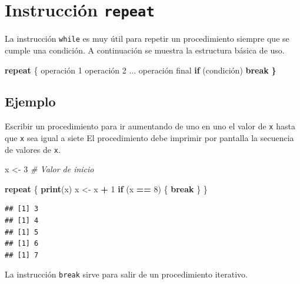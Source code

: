 \documentclass[10pt,]{krantz}
\makeatletter
\newenvironment{Shaded}{\begin{snugshade}}{\end{snugshade}}
\newcommand{\KeywordTok}[1]{\textcolor[rgb]{0.13,0.29,0.53}{\textbf{#1}}}
\newcommand{\DecValTok}[1]{\textcolor[rgb]{0.00,0.00,0.81}{#1}}
\newcommand{\StringTok}[1]{\textcolor[rgb]{0.31,0.60,0.02}{#1}}
\newcommand{\CommentTok}[1]{\textcolor[rgb]{0.56,0.35,0.01}{\textit{#1}}}
\newcommand{\ControlFlowTok}[1]{\textcolor[rgb]{0.13,0.29,0.53}{\textbf{#1}}}
\newcommand{\OperatorTok}[1]{\textcolor[rgb]{0.81,0.36,0.00}{\textbf{#1}}}
\newcommand{\ErrorTok}[1]{\textcolor[rgb]{0.64,0.00,0.00}{\textbf{#1}}}
\newcommand{\NormalTok}[1]{#1}
\newenvironment{kframe}{%
\medskip{}
\setlength{\fboxsep}{.8em}
 \def\at@end@of@kframe{}%
 \ifinner\ifhmode%
  \def\at@end@of@kframe{\end{minipage}}%
  \begin{minipage}{\columnwidth}%
 \fi\fi%
 \def\FrameCommand##1{\hskip\@totalleftmargin \hskip-\fboxsep
 \colorbox{shadecolor}{##1}\hskip-\fboxsep
     \hskip-\linewidth \hskip-\@totalleftmargin \hskip\columnwidth}%
 \MakeFramed {\advance\hsize-\width
   \@totalleftmargin\z@ \linewidth\hsize
   \@setminipage}}%
 {\par\unskip\endMakeFramed%
 \at@end@of@kframe}
\renewenvironment{Shaded}{\begin{kframe}}{\end{kframe}}
\let\BeginKnitrBlock\begin \let\EndKnitrBlock\end
\makeatother
\begin{document}
\section{\texorpdfstring{Instrucción \texttt{repeat}
}{Instrucción repeat }}\label{instruccion-repeat}

La instrucción \texttt{while} es muy útil para repetir un procedimiento
siempre que se cumple una condición. A continuación se muestra la
estructura básica de uso.

\begin{Shaded}
\begin{Highlighting}[]
\ControlFlowTok{repeat}\NormalTok{ \{}
\NormalTok{  operación }\DecValTok{1}
\NormalTok{  operación }\DecValTok{2}
\NormalTok{  ...}
\NormalTok{  operación final}
  \ControlFlowTok{if}\NormalTok{ (condición) }\ControlFlowTok{break}
\ErrorTok{\}}
\end{Highlighting}
\end{Shaded}

\subsection*{Ejemplo}\label{ejemplo-19}


Escribir un procedimiento para ir aumentando de uno en uno el valor de
\texttt{x} hasta que \texttt{x} sea igual a siete El procedimiento debe
imprimir por pantalla la secuencia de valores de \texttt{x}.

\begin{Shaded}
\begin{Highlighting}[]
\NormalTok{x <-}\StringTok{ }\DecValTok{3}  \CommentTok{# Valor de inicio}

\ControlFlowTok{repeat}\NormalTok{ \{}
   \KeywordTok{print}\NormalTok{(x)}
\NormalTok{   x <-}\StringTok{  }\NormalTok{x }\OperatorTok{+}\StringTok{ }\DecValTok{1}
   \ControlFlowTok{if}\NormalTok{ (x }\OperatorTok{==}\StringTok{ }\DecValTok{8}\NormalTok{) \{}
     \ControlFlowTok{break}
\NormalTok{   \}}
\NormalTok{\}}
\end{Highlighting}
\end{Shaded}

\begin{verbatim}
## [1] 3
## [1] 4
## [1] 5
## [1] 6
## [1] 7
\end{verbatim}

\BeginKnitrBlock{rmdtip}
La instrucción \texttt{break} sirve para salir de un procedimiento
iterativo.
\EndKnitrBlock{rmdtip}
\end{document}
